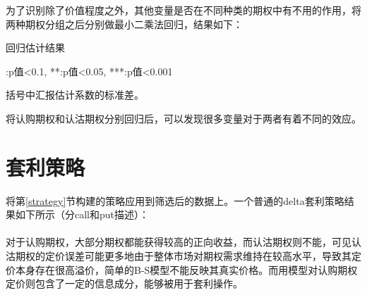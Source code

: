 \par{为了识别除了价值程度之外，其他变量是否在不同种类的期权中有不用的作用，将两种期权分组之后分别做最小二乘法回归，结果如下：}
\newpage
{}
\begin{center}
    \begin{threeparttable}[H]

        \caption{回归估计结果}

        
        \begin{tablenotes}
            \footnotesize
            \item *:p值<0.1, **:p值<0.05, ***:p值<0.001
            \item 括号中汇报估计系数的标准差。
        \end{tablenotes}
    \end{threeparttable}
\end{center}
\newpage
\restoregeometry
将认购期权和认沽期权分别回归后，可以发现很多变量对于两者有着不同的效应。
\section{套利策略}
将第\ref{strategy}节构建的策略应用到筛选后的数据上。一个普通的delta套利策略结果如下所示（分call和put描述）：
~\\


~\\
对于认购期权，大部分期权都能获得较高的正向收益，而认沽期权则不能，可见认沽期权的定价误差可能更多地由于整体市场对期权需求维持在较高水平，导致其定价本身存在很高溢价，简单的B-S模型不能反映其真实价格。而用模型对认购期权定价则包含了一定的信息成分，能够被用于套利操作。
% 
% 

